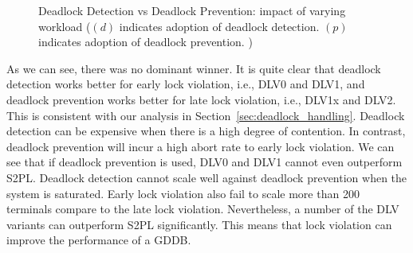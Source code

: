 \documentclass[conference]{IEEEtran}
\begin{document}
\begin{figure}[tbp]
  \centering



            

\caption{Deadlock Detection vs Deadlock Prevention: impact of varying workload
($(d)$ indicates adoption of deadlock detection. $(p)$ indicates adoption of deadlock prevention. ) }
\label{fig:ycsb_deadlock}
\end{figure}

      
As we can see, there was no dominant winner. It is quite clear that deadlock detection works better for early lock violation, i.e., DLV0 and DLV1, 
and deadlock prevention works better for late lock violation, i.e., DLV1x and DLV2. This is consistent with our analysis in Section~\ref{sec:deadlock_handling}.
Deadlock detection can be expensive when there is a high degree of contention. In contrast, deadlock prevention will incur a high abort rate to early lock violation.
We can see that if deadlock prevention is used, DLV0 and DLV1 cannot even outperform S2PL. 
Deadlock detection cannot scale well against deadlock prevention when the system is saturated.
Early lock violation also fail to scale more than 200 terminals compare to the late lock violation.
Nevertheless, a number of the DLV variants can outperform S2PL significantly. This means that lock violation can improve the performance of a GDDB.
\end{document}

